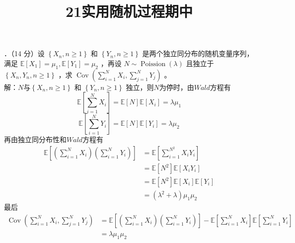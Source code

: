 \documentclass[UTF8]{ctexart}
\title{21实用随机过程期中}
\author{\textcalligra{NULIOUS}}
\date{}
\begin{document}
\maketitle
{}．（14 分）设 $\left\{X_{n}, n \geq 1\right\}$ 和 $\left\{Y_{n}, n \geq 1\right\}$ 是两个独立同分布的随机变量序列，满足 $\mathbb{E} [X_{1}]=\mu_{1}, \mathbb{E} [Y_{1}]=\mu_{2}$ ，再设 $N \sim \operatorname{Poission}(\lambda)$ 且独立于 $\left\{X_{n}, Y_{n}, n \geq 1\right\}$ ，求 $\operatorname{Cov}\left(\sum\limits_{i=1}^N X_{i}, \sum\limits_{j=1}^N Y_{j}\right)$ 。\\
解：$N$与$\left\{X_{n}, n \geq 1\right\}$ 和 $\left\{Y_{n}, n \geq 1\right\}$ 独立，则$N$为停时，由$Wald$方程有
\[
\mathbb{E}\left[\sum\limits_{i=1}^N X_{i} \right]=\mathbb{E}[N]\mathbb{E}[X_i]=\lambda \mu_1 
\]
\[
\mathbb{E}\left[\sum\limits_{i=1}^N Y_{i} \right]=\mathbb{E}[N]\mathbb{E}[Y_i]=\lambda \mu_2
\]
再由独立同分布性和$Wald$方程有
\begin{align*}
	\mathbb{E}\left[\left(\sum_{i=1}^N X_i \right) \left(\sum_{i=1}^N Y_i  \right)   \right]  & =\mathbb{E}\left[\sum\limits_{i=1}^{N^2} X_iY_i \right] \\
	 & =\mathbb{E}[N^2]\mathbb{E}[X_iY_i]\\
	 &=\mathbb{E}[N^2]\mathbb{E}[X_i]\mathbb{E}[Y_i]\\
	 &=(\lambda^2+\lambda)\mu_1 \mu_2
\end{align*}
最后
\begin{align*}
	\operatorname{Cov}\left(\sum\limits_{i=1}^N X_{i}, \sum\limits_{j=1}^N Y_{j}\right) & =\mathbb{E}\left[\left(\sum_{i=1}^N X_i \right) \left(\sum_{i=1}^N Y_i  \right)   \right]-\mathbb{E}\left[\sum\limits_{i=1}^N X_{i} \right]\mathbb{E}\left[\sum\limits_{i=1}^N Y_{i} \right] \\
	 & =\lambda \mu_1 \mu_2
\end{align*}\\
\end{document}
